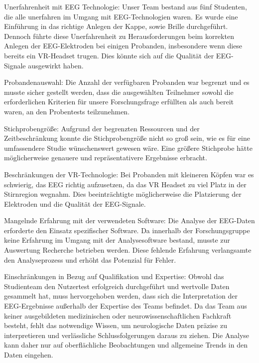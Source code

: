 \documentclass[conference]{IEEEtran}
\begin{document}
\begin{myitemize}
	\item Unerfahrenheit mit EEG Technologie: Unser Team bestand aus fünf Studenten, die alle unerfahren im Umgang mit EEG-Technologien waren. Es wurde eine Einführung in das richtige Anlegen der Kappe, sowie Brille durchgeführt. Dennoch führte diese Unerfahrenheit zu Herausforderungen beim korrekten Anlegen der EEG-Elektroden bei einigen Probanden, insbesondere wenn diese bereits ein VR-Headset trugen. Dies könnte sich auf die Qualität der EEG-Signale ausgewirkt haben.
	\item Probandenauswahl: Die Anzahl der verfügbaren Probanden war begrenzt und es musste sicher gestellt werden, dass die ausgewählten Teilnehmer sowohl die erforderlichen Kriterien für unsere Forschungsfrage erfüllten als auch bereit waren, an den Probentests teilzunehmen.
	\item Stichprobengröße: Aufgrund der begrenzten Ressourcen und der Zeitbeschränkung konnte die Stichprobengröße nicht so groß sein, wie es für eine umfassendere Studie wünschenswert gewesen wäre. Eine größere Stichprobe hätte möglicherweise genauere und repräsentativere Ergebnisse erbracht.
	\item Beschränkungen der VR-Technologie: Bei Probanden mit kleineren Köpfen war es schwierig, das EEG richtig aufzusetzen, da das VR Headset zu viel Platz in der Stirnregion wegnahm. Dies beeinträchtigte möglicherweise die Platzierung der Elektroden und die Qualität der EEG-Signale.
	\item Mangelnde Erfahrung mit der verwendeten Software: Die Analyse der EEG-Daten erforderte den Einsatz spezifischer Software. Da innerhalb der Forschungsgruppe keine Erfahrung im Umgang mit der Analysesoftware bestand, musste zur Auswertung Recherche betrieben werden. Diese fehlende Erfahrung verlangsamte den Analyseprozess und erhöht das Potenzial für Fehler.
    \item Einschränkungen in Bezug auf Qualifikation und Expertise:
    Obwohl das Studienteam den Nutzertest erfolgreich durchgeführt und wertvolle Daten gesammelt hat, muss hervorgehoben werden, dass sich die Interpretation der EEG-Ergebnisse außerhalb der Expertise des Teams befindet. Da das Team aus keiner ausgebildeten medizinischen oder neurowissenschaftlichen Fachkraft besteht, fehlt das notwendige Wissen, um neurologische Daten präzise zu interpretieren und verlässliche Schlussfolgerungen daraus zu ziehen. Die Analyse kann daher nur auf oberflächliche Beobachtungen und allgemeine Trends in den Daten eingehen.


\end{myitemize}
\end{document}
